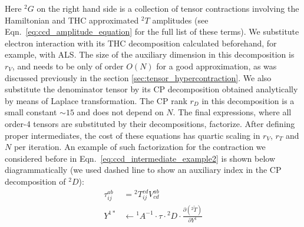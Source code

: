 Here ${}^2G$ on the right hand side is a collection of tensor contractions 
involving the Hamiltonian and THC approximated ${}^2T$ amplitudes 
(see Eqn.~\ref{eq:ccd_amplitude_equation} for the full list of these terms).
We substitute electron interaction with its THC decomposition calculated 
beforehand, for example, with ALS. The size of the auxiliary dimension in 
this decomposition is $r_{V}$, and needs to be only of order $O(N)$ for a good 
approximation, as was discussed previously in the section 
\ref{sec:tensor_hypercontraction}. We also substitute the denominator tensor by 
its CP decomposition obtained analytically by means of Laplace transformation. 
The CP rank $r_{D}$ in this decomposition is a small constant $\sim 15$ and 
does not depend on $N$. The final expressions, where all order-4 tensors are 
substituted by their decompositions, factorize. After defining proper 
intermediates, the cost of these equations has quartic scaling in $r_{V}$, 
$r_{T}$ and $N$ per iteration. An example of such factorization for the 
contraction we considered before in Eqn.~\ref{eq:ccd_intermediate_example2} is 
shown below diagrammatically (we used dashed line to show an auxiliary 
index in the CP decomposition of ${}^2 D$):
\begin{equation}
\begin{split}
\tau^{ab}_{ij} & = {}^2 T^{cd}_{ij} V^{ab}_{cd} \\
Y^{1 \ast} &\longleftarrow {}^1A^{-1} \cdot \tau \cdot {}^{2}D 
\cdot \frac{\partial ({}^2\tilde{T})}{\partial Y^{1}}
\end{split}
\end{equation}


